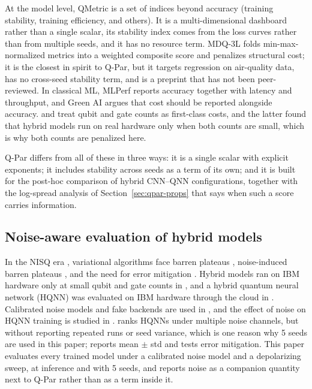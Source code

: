 \documentclass{ieeeaccess}
\begin{document}
At the model level, QMetric \cite{illesova2025qmetric} is a set of indices beyond accuracy (training stability, training efficiency, and others). It is a multi-dimensional dashboard rather than a single scalar, its stability index comes from the loss curves rather than from multiple seeds, and it has no resource term. MDQ-3L \cite{mogaraju2026mdq3l} folds min-max-normalized metrics into a weighted composite score and penalizes structural cost; it is the closest in spirit to Q-Par, but it targets regression on air-quality data, has no cross-seed stability term, and is a preprint that has not been peer-reviewed. In classical ML, MLPerf \cite{reddi2020mlperf} reports accuracy together with latency and throughput, and Green AI \cite{schwartz2020greenai} argues that cost should be reported alongside accuracy. \cite{lee2024optimizing} and \cite{arthur2022qce} treat qubit and gate counts as first-class costs, and the latter found that hybrid models run on real hardware only when both counts are small, which is why both counts are penalized here.

Q-Par differs from all of these in three ways: it is a single scalar with explicit exponents; it includes stability across seeds as a term of its own; and it is built for the post-hoc comparison of hybrid CNN--QNN configurations, together with the log-spread analysis of Section~\ref{sec:qpar-props} that says when such a score carries information.

\subsection{Noise-aware evaluation of hybrid models}
\label{sec:rw-noise}

In the NISQ era \cite{preskill2018nisq}, variational algorithms \cite{cerezo2021vqa} face barren plateaus \cite{mcclean2018barren}, noise-induced barren plateaus \cite{wang2021noisebp}, and the need for error mitigation \cite{cai2023qem}. Hybrid models ran on IBM hardware only at small qubit and gate counts in \cite{arthur2022qce}, and a hybrid quantum neural network (HQNN) was evaluated on IBM hardware through the cloud in \cite{mittal2024localization}. Calibrated noise models and fake backends are used in \cite{wang2022quantumnas,kim2026depthstratified,mousavi2026trainingfree}, and the effect of noise on HQNN training is studied in \cite{kashif2024noise}. \cite{ahmed2025noisyhqnn} ranks HQNNs under multiple noise channels, but without reporting repeated runs or seed variance, which is one reason why 5 seeds are used in this paper; \cite{kim2026reliability} reports mean $\pm$ std and tests error mitigation. This paper evaluates every trained model under a calibrated noise model and a depolarizing sweep, at inference and with 5 seeds, and reports noise as a companion quantity next to Q-Par rather than as a term inside it.
\end{document}
